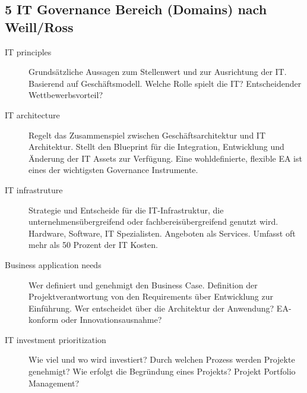 \subsection{5 IT Governance Bereich (Domains) nach Weill/Ross}
\begin{description}
	\item[IT principles] Grundsätzliche Aussagen zum Stellenwert und zur Ausrichtung der IT. Basierend auf Geschäftsmodell. Welche Rolle spielt die IT? Entscheidender Wettbewerbsvorteil?
	\item[IT architecture] Regelt das Zusammenspiel zwischen Geschäftsarchitektur und IT Architektur. Stellt den Blueprint für die Integration, Entwicklung und Änderung der IT Assets zur Verfügung. Eine wohldefinierte, flexible EA ist eines der wichtigsten Governance Instrumente.
	\item[IT infrastruture] Strategie und Entscheide für die IT-Infrastruktur, die unternehmensübergreifend oder fachbereisübergreifend genutzt wird. Hardware, Software, IT Spezialisten. Angeboten als Services. Umfasst oft mehr als 50 Prozent der IT Kosten.
	\item[Business application needs] Wer definiert und genehmigt den Business Case. Definition der Projektverantwortung von den Requirements über Entwicklung zur Einführung. Wer entscheidet über die Architektur der Anwendung? EA-konform oder Innovationsausnahme?
	\item[IT investment prioritization] Wie viel und wo wird investiert? Durch welchen Prozess werden Projekte genehmigt? Wie erfolgt die Begründung eines Projekts? Projekt Portfolio Management?
\end{description}

